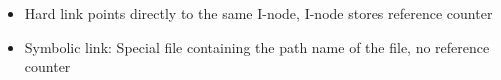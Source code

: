\documentclass[10pt, landscape]{article}
\begin{document}
\begin{multicols*}{3}
\begin{itemize}
	\item Hard link points directly to the same I-node, I-node stores reference counter
	\item Symbolic link: Special file containing the path name of the file, no reference counter
\end{itemize}

\end{multicols*}
\end{document}

